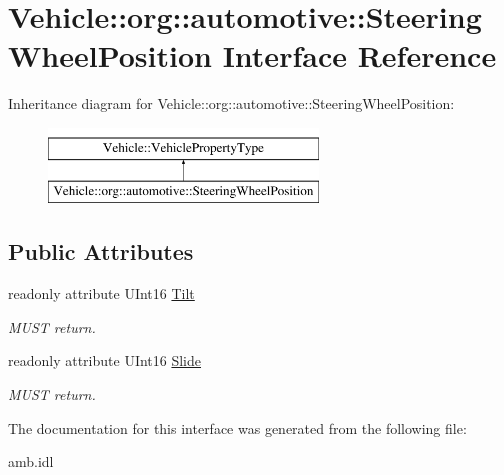 \hypertarget{interfaceVehicle_1_1org_1_1automotive_1_1SteeringWheelPosition}{\section{Vehicle\-:\-:org\-:\-:automotive\-:\-:Steering\-Wheel\-Position Interface Reference}
\label{interfaceVehicle_1_1org_1_1automotive_1_1SteeringWheelPosition}
}
Inheritance diagram for Vehicle\-:\-:org\-:\-:automotive\-:\-:Steering\-Wheel\-Position\-:\begin{figure}[H]
\begin{center}
\leavevmode
\includegraphics[height=2.000000cm]{interfaceVehicle_1_1org_1_1automotive_1_1SteeringWheelPosition}
\end{center}
\end{figure}
\subsection*{Public Attributes}
\begin{DoxyCompactItemize}
\item 
\hypertarget{interfaceVehicle_1_1org_1_1automotive_1_1SteeringWheelPosition_a35a821b6a229ac37c993f6174b8b654a}{readonly attribute U\-Int16 \hyperlink{interfaceVehicle_1_1org_1_1automotive_1_1SteeringWheelPosition_a35a821b6a229ac37c993f6174b8b654a}{Tilt}}\label{interfaceVehicle_1_1org_1_1automotive_1_1SteeringWheelPosition_a35a821b6a229ac37c993f6174b8b654a}

\begin{DoxyCompactList}\small\item\em M\-U\-S\-T return. \end{DoxyCompactList}\item 
\hypertarget{interfaceVehicle_1_1org_1_1automotive_1_1SteeringWheelPosition_aeb537a6d71a60cd2c5a3b38f95f3460e}{readonly attribute U\-Int16 \hyperlink{interfaceVehicle_1_1org_1_1automotive_1_1SteeringWheelPosition_aeb537a6d71a60cd2c5a3b38f95f3460e}{Slide}}\label{interfaceVehicle_1_1org_1_1automotive_1_1SteeringWheelPosition_aeb537a6d71a60cd2c5a3b38f95f3460e}

\begin{DoxyCompactList}\small\item\em M\-U\-S\-T return. \end{DoxyCompactList}\end{DoxyCompactItemize}


The documentation for this interface was generated from the following file\-:\begin{DoxyCompactItemize}
\item 
amb.\-idl\end{DoxyCompactItemize}
